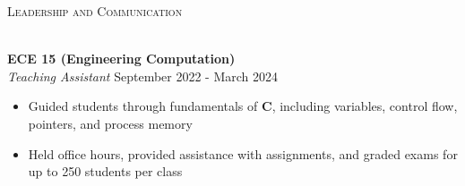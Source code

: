 \documentclass[a4paper]{article}
\newcommand{\lineunder} {
    \vspace*{-8pt} \\
    \hspace*{-18pt} \hrulefill \\
}
\newcommand{\header} [1] {
    {\hspace*{-18pt}\vspace*{6pt} \textsc{#1}}
    \vspace*{-6pt} \lineunder
}
\newenvironment{entry}[4][]{
  \textbf{#2} \hfill #1 \\
  \textit{#3} \hfill #4 \\
  \vspace{-2mm}
  \begin{itemize} \itemsep 0em
  }
  {
  \end{itemize}
}
\begin{document}
\begin{comment}
\begin{entry}{ACM Meme Gen}{Full Stack Web Development}{June 2019 - December 2019}
\item Created a meme generator as a supplement for students to learn \textbf{MongoDB}, \textbf{Express}, \textbf{React}, and \textbf{Node.js}
\item Implemented \textbf{React} components and state management, called the
  Imgflip API for templates
\item \textbf{MongoDB} back-end used to store user-created memes for a central gallery
\end{entry}

\begin{entry}{Infantry Firmware - Robomaster}{Firmware, Circuit Design}{January 2019 - August 2019}
\item Implemented control firmware on \textbf{STM32} chip for a 2-DOF turret mounted on a 4-wheel robot
\item Angle control of motors achieved using sensor data from \textbf{encoders} and \textbf{IMU}
  over \textbf{UART} and \textbf{I2C} with \textbf{PID}
\item Designed and soldered power circuit with supercaps in parallel with
  battery to circumvent power restrictions
\end{entry}

\begin{entry}{Reef Pin}{Firmware, Circuit Design}{November 2018 - June 2019}
\item Designed and tested system for a device used to measure depth for coral reef mapping
\item Used a MS5803-14BA pressure sensor to measure depth and an MLX90393 magnetometer for cardinal direction
\item Used \textbf{I2C} to retrieve sensor data and communicate with LED driver, logged data to an SD card using \textbf{SPI}
\end{entry}
\end{comment}
\header{Leadership and Communication}
\vspace{1mm}

\begin{entry}{ECE 15 (Engineering Computation)}{Teaching Assistant}{September 2022 - March 2024}
  \item Guided students through fundamentals of \textbf{C},
    including variables, control flow, pointers, and process memory 
  \item Held office hours, provided assistance with assignments, and graded exams for up to 250 students per class
\end{entry}
\end{document}
